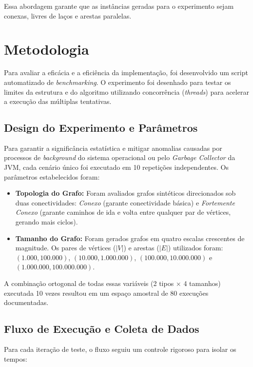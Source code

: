 \documentclass[12pt]{article}
\begin{document}
Essa abordagem garante que as instâncias geradas para o experimento sejam conexas, livres de laços e arestas paralelas.

\section{Metodologia} \label{metodologia}

Para avaliar a eficácia e a eficiência da implementação, foi desenvolvido um script automatizado de \textit{benchmarking}. O experimento foi desenhado para testar os limites da estrutura e do algoritmo utilizando concorrência (\textit{threads}) para acelerar a execução das múltiplas tentativas.

\subsection{Design do Experimento e Parâmetros}

Para garantir a significância estatística e mitigar anomalias causadas por processos de \textit{background} do sistema operacional ou pelo \textit{Garbage Collector} da JVM, cada cenário único foi executado em 10 repetições independentes. Os parâmetros estabelecidos foram:

\begin{itemize}
    \item \textbf{Topologia do Grafo:} Foram avaliados grafos sintéticos direcionados sob duas conectividades: \textit{Conexo} (garante conectividade básica) e \textit{Fortemente Conexo} (garante caminhos de ida e volta entre qualquer par de vértices, gerando mais ciclos).
    
    \item \textbf{Tamanho do Grafo:} Foram gerados grafos em quatro escalas crescentes de magnitude. Os pares de vértices ($|V|$) e arestas ($|E|$) utilizados foram: $(1.000, 100.000)$, $(10.000, 1.000.000)$, $(100.000, 10.000.000)$ e $(1.000.000, 100.000.000)$.
\end{itemize}

A combinação ortogonal de todas essas variáveis (2 tipos $\times$ 4 tamanhos) executada 10 vezes resultou em um espaço amostral de 80 execuções documentadas.

\subsection{Fluxo de Execução e Coleta de Dados}

Para cada iteração de teste, o fluxo seguiu um controle rigoroso para isolar os tempos:
\end{document}
